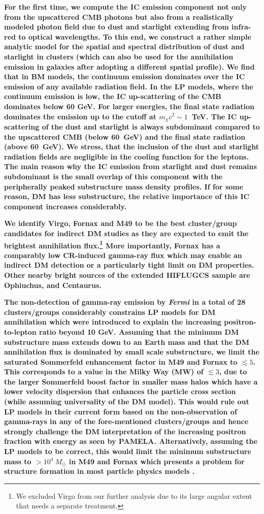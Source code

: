 \documentclass[10pt,aps,pra,reprint,amsmath,amsfonts,amssymb,showpacs,nofootinbib,floatfix]{revtex4-1}
\def\C#1{{\bf #1}}
\newcommand{\Fermi}{{\em Fermi}\xspace}
\newcommand{\msun}{M_\odot}
\begin{document}
\C{For the first time, we compute the IC emission component not only
  from the upscattered CMB photons but also from a realistically
  modeled photon field due to dust and starlight extending from
  infra-red to optical wavelengths. To this end, we construct a rather
  simple analytic model for the spatial and spectral distribution of
  dust and starlight in clusters (which can also be used for the
  annihilation emission in galaxies after adopting a different spatial
  profile). We find that in BM models, the continuum emission
  dominates over the IC emission of any available radiation field. In
  the LP models, where the continuum emission is low, the IC
  up-scattering of the CMB dominates below 60 GeV. For larger
  energies, the final state radiation dominates the emission up to the
  cutoff at $m_\chi c^2 \sim 1$~TeV. The IC up-scattering of the dust
  and starlight is always subdominant compared to the upscattered CMB
  (below 60~GeV) and the final state radiation (above 60~GeV). We
  stress, that the inclusion of the dust and starlight radiation
  fields are negligible in the cooling function for the leptons. The
  main reason why the IC emission from starlight and dust remains
  subdominant is the small overlap of this component with the
  peripherally peaked substructure mass density profiles. If for some
  reason, DM has less substructure, the relative importance of this IC
  component increases considerably.}

\C{We identify Virgo, Fornax and M49 to be the best cluster/group
  candidates for indirect DM studies as they are expected to emit the
  brightest annihilation flux.\footnote{We excluded Virgo from our
    further analysis due to its large angular extent that needs a
    separate treatment.} More importantly, Fornax has a comparably low
  CR-induced gamma-ray flux which may enable an indirect DM detection
  or a particularly tight limit on DM properties. Other nearby bright
  sources of the extended HIFLUGCS sample are Ophiuchus, and
  Centaurus.}

\C{The non-detection of gamma-ray emission by \Fermi in a total of 28
  clusters/groups considerably constrains LP models for DM
  annihilation which were introduced to explain the increasing
  positron-to-lepton ratio beyond 10 GeV. Assuming that the minimum DM
  substructure mass extends down to an Earth mass and that the DM
  annihilation flux is dominated by small scale substructure, we limit
  the saturated Sommerfeld enhancement factor in M49 and Fornax to
  $\lesssim 5$. This corresponds to a value in the Milky Way (MW) of
  $\lesssim3$, due to the larger Sommerfeld boost factor in smaller
  mass halos which have a lower velocity dispersion that enhances the
  particle cross section (while assuming universality of the DM
  model). This would rule out LP models in their current form based on
  the non-observation of gamma-rays in any of the fore-mentioned
  clusters/groups and hence strongly challenge the DM interpretation
  of the increasing positron fraction with energy as seen by
  PAMELA. Alternatively, assuming the LP models to be correct, this
  would limit the minimum substructure mass to $>10^4~\msun$ in M49
  and Fornax which presents a problem for structure formation in most
  particle physics models \cite{2009NJPh...11j5027B}.}
\end{document}
